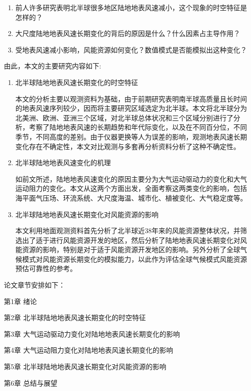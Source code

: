 \begin{enumerate}
\item 前人许多研究表明北半球很多地区陆地地表风速减小，这个现象的时空特征是怎样的？
\item 大尺度陆地地表风速长期变化的背后的原因是什么？什么因素占主导作用？
\item 受地表风速减小影响，风能资源如何变化？数值模式是否能模拟出这种变化？

\end{enumerate}

由此，本文的主要研究内容如下:

\begin{enumerate}
\item 北半球陆地地表风速长期变化的时空特征

本文的分析主要以观测资料为基础，由于前期研究表明南半球高质量且长时间的地表风速序列较少，因而将主要研究区域选定为北半球。本文将北半球分为北美洲、欧洲、亚洲三个区域，对北半球总体状况和三个区域分别进行了分析，考察了陆地地表风速的长期趋势和年代际变化，以及在不同百分位，不同季节，不同高度的差别。由于仪器更换等人为误差的影响，观测地表风速长期变化存在不确定性，本文对比观测与多套再分析资料分析了这种不确定性。

\item 北半球陆地地表风速变化的机理

如前文所述，陆地地表风速变化的原因主要分为大气运动驱动力的变化和大气运动阻力的变化。本文从这两个方面出发，全面考察这两类变化的影响，包括海平面气压场、环流系统、大尺度海温、城市化、植被变化、大气稳定度等。

\item 北半球陆地地表风速长期变化对风能资源的影响

本文利用地面观测资料首先分析了北半球近38年来的风能资源整体状况，并筛选出了适于进行风能资源开发的地区，然后分析了陆地地表风速长期变化对风能资源的影响，特别是对于适于风能资源开发地区的影响。另外分析了全球气候模式对风能资源长期变化的模拟能力，以此作为评估全球气候模式风能资源预估可靠性的参考。

\end{enumerate}

论文章节安排如下：

第1章	\quad 绪论

第2章	\quad 北半球陆地地表风速长期变化的时空特征

第3章	\quad 大气运动驱动力变化对陆地地表风速长期变化的影响

第4章	\quad 大气运动阻力变化对陆地地表风速长期变化的影响

第5章	\quad 北半球陆地地表风速长期变化对风能资源的影响

第6章	\quad 总结与展望
